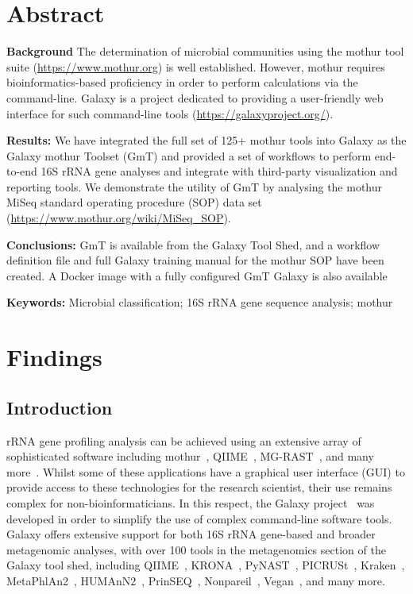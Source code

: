 \section*{Abstract}
\textbf{Background} The determination of microbial communities using the mothur tool suite (\url{https://www.mothur.org}) is well established. However, mothur requires bioinformatics-based proficiency in order to perform calculations via the command-line. Galaxy is a project dedicated to providing a user-friendly web interface for such command-line tools (\url{https://galaxyproject.org/}).

\textbf{Results:} We have integrated the full set of 125+ mothur tools into Galaxy as the Galaxy mothur Toolset (GmT) and provided a set of workflows to perform end-to-end 16S rRNA gene analyses and integrate with third-party visualization and reporting tools.  We demonstrate the utility of GmT by analysing the mothur MiSeq standard operating procedure (SOP) data set (\url{https://www.mothur.org/wiki/MiSeq\_SOP}).

\textbf{Conclusions:} GmT is available from the Galaxy Tool Shed, and a workflow definition file and full Galaxy training manual for the mothur SOP have been created. A Docker image with a fully configured GmT Galaxy is also available

\textbf{Keywords:} Microbial classification; 16S rRNA gene sequence analysis; mothur

\section*{Findings}

\subsection*{Introduction}
 rRNA gene profiling analysis can be achieved using an extensive array of sophisticated software including mothur~\cite{schloss2009introducing}, QIIME~\cite{caporaso2010qiime}, MG-RAST~\cite{glass2010using}, and many more~\cite{oulas2015metagenomics}. Whilst some of these applications have a graphical user interface (GUI) to provide access to these technologies for the research scientist, their use remains complex for non-bioinformaticians. In this respect, the Galaxy project~\cite{afgan2016galaxy} was developed in order to simplify the use of complex command-line software tools. Galaxy offers extensive support for both 16S rRNA gene-based and broader metagenomic analyses, with over 100 tools in the metagenomics section of the Galaxy tool shed, including QIIME~\cite{caporaso2010qiime}, KRONA~\cite{ondov2011interactive}, PyNAST~\cite{caporaso2009pynast}, PICRUSt~\cite{langille2013predictive}, Kraken~\cite{wood2014kraken}, MetaPhlAn2~\cite{truong2015metaphlan2}, HUMAnN2~\cite{abubucker2012metabolic}, PrinSEQ~\cite{schmieder2011quality}, Nonpareil~\cite{rodriguez2013nonpareil}, Vegan~\cite{dixon2003vegan}, and many more.

